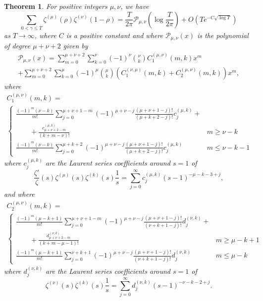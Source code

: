 \documentclass[12pt, a4paper,reqno]{amsart}
\newtheorem{theorem}{Theorem}
\theoremstyle{definition}
\numberwithin{equation}{section}
\begin{document}
\begin{theorem}\label{mainthm}
    For positive integers $\mu,\nu$, we have 
    \begin{equation}\label{mainthmeq}
        \sum_{0<\gamma\le T}\zeta^{(\mu)}(\rho)\zeta^{(\nu)}(1-\rho)=\frac{T}{2\pi}\mathcal{P}_{\mu,\nu}\left(\log\frac{T}{2\pi}\right)+O\left(Te^{-C\sqrt{\log T}}\right)
    \end{equation}
    as $T\to\infty$, where $C$ is a positive constant and where $\mathcal{P}_{\mu,\nu}(x)$ is the polynomial of degree $\mu+\nu+2$ given by
    \begin{multline}\label{eq:poly}
        \mathcal{P}_{\mu,\nu}(x) = \sum_{m=0}^{\mu+\nu+2} \sum_{k=0}^{\nu}  (-1)^{\nu}  \binom{\nu}{k} C_1^{(\mu,\nu)}(m,k)x^m\\
        +\sum_{m=0}^{\mu+\nu+2} \sum_{k=0}^{\mu}  (-1)^{\mu}  \binom{\mu}{k} \left(C_1^{(\nu,\mu)}(m,k)+C_2^{(\mu,\nu)}(m,k)\right)x^m,
    \end{multline}
    where
\begin{multline*}
C_1^{(\mu,\nu)}(m,k) = \\
\begin{cases} 
\displaystyle \frac{(-1)^m(\nu-k)}{m!} \sum_{j=0}^{\mu+\nu+1-m}  (-1)^{\mu+\nu-j} \frac{ (\mu+\nu+1-j)! }{(\mu+k+2-j)!} c^{(\mu,k)}_{j} +\\
\displaystyle \qquad + \frac{c^{(\mu,k)}_{\mu+\nu+2-m}}{(k+m-\nu)!} &  m \geq \nu-k \\[3ex]
\displaystyle \frac{(-1)^m(\nu-k)}{m!} \sum_{j=0}^{\mu+k+2}  (-1)^{\mu+\nu-j} \frac{ (\mu+\nu+1-j)! }{(\mu+k+2-j)!} c^{(\mu,k)}_{j}  & m \leq \nu -k-1
\end{cases}
\end{multline*}
where $c^{(\mu,k)}_{j}$ are the Laurent series coefficients around $s=1$ of \begin{equation}
    \frac{\zeta'}{\zeta}(s)\zeta^{(\mu)}(s)\zeta^{(k)}(s)\frac{1}{s}=\sum_{j=0}^{\infty}c^{(\mu,k)}_{j}(s-1)^{-\mu-k-3+j} ,
\end{equation}
    and  where
\begin{multline*}
    C_2^{(\mu,\nu)}(m,k) = \\
\begin{cases} 
\displaystyle  \frac{(-1)^m(\mu-k+1)}{m!} \sum_{j=0}^{\mu+\nu+1-m} (-1)^{\mu+\nu-j}  \frac{(\mu+\nu+1-j)!}{(\nu+k+1-j)!} d_{j}^{(\nu,k)} +  \\
\displaystyle \qquad  +\frac{d_{\mu+\nu+2-m}^{(\nu,k)}}{(k+m-\mu-1)!} & m \geq \mu-k+1 \\[3ex]
\displaystyle  \frac{(-1)^m(\mu-k+1)}{m!} \sum_{j=0}^{\nu+k+1} (-1)^{\mu+\nu-j}  \frac{(\mu+\nu+1-j)!}{(\nu+k+1-j)!} d_{j}^{(\nu,k)}  & m \leq \mu-k
\end{cases}
\end{multline*}
where $d_{j}^{(\nu,k)}$ are the Laurent series coefficients around $s=1$ of 
    \begin{equation*}
        \zeta^{(\nu)}(s)\zeta^{(k)}(s)\frac{1}{s}=\sum_{j=0}^{\infty}d_{j}^{(\nu,k)}(s-1)^{-\nu-k-2+j}.
    \end{equation*}


\end{theorem}
\end{document}

